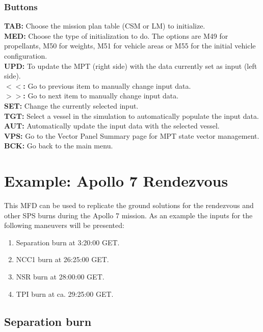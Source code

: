 \documentclass[11pt]{article} %
\begin{document}
\subsubsection{Buttons}
\textbf{TAB:} Choose the mission plan table (CSM or LM) to initialize.\\
\textbf{MED:} Choose the type of initialization to do. The options are M49 for propellants, M50 for weights, M51 for vehicle areas or M55 for the initial vehicle configuration.\\
\textbf{UPD:} To update the MPT (right side) with the data currently set as input (left side).\\
\textbf{$<<$:} Go to previous item to manually change input data.\\
\textbf{$>>$:} Go to next item to manually change input data.\\
\textbf{SET:} Change the currently selected input.\\
\textbf{TGT:} Select a vessel in the simulation to automatically populate the input data.\\
\textbf{AUT:} Automatically update the input data with the selected vessel.\\
\textbf{VPS:} Go to the Vector Panel Summary page for MPT state vector management.\\
\textbf{BCK:} Go back to the main menu.\\
\newpage
\section{Example: Apollo 7 Rendezvous}

This MFD can be used to replicate the ground solutions for the rendezvous and other SPS burns during the Apollo 7 mission. As an example the inputs for the following maneuvers will be presented:

\begin{enumerate}
	\item {Separation burn at 3:20:00 GET.}
	\item {NCC1 burn at 26:25:00 GET.}
	\item {NSR burn at 28:00:00 GET.}
	\item {TPI burn at ca. 29:25:00 GET.}
\end{enumerate}

\subsection{Separation burn}
\end{document}
